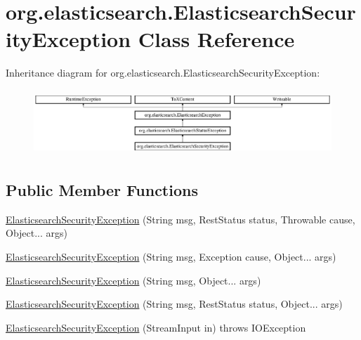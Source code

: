 \hypertarget{classorg_1_1elasticsearch_1_1_elasticsearch_security_exception}{}\section{org.\+elasticsearch.\+Elasticsearch\+Security\+Exception Class Reference}
\label{classorg_1_1elasticsearch_1_1_elasticsearch_security_exception}
Inheritance diagram for org.\+elasticsearch.\+Elasticsearch\+Security\+Exception\+:\begin{figure}[H]
\begin{center}
\leavevmode
\includegraphics[height=2.488889cm]{classorg_1_1elasticsearch_1_1_elasticsearch_security_exception}
\end{center}
\end{figure}
\subsection*{Public Member Functions}
\begin{DoxyCompactItemize}
\item 
\hyperlink{classorg_1_1elasticsearch_1_1_elasticsearch_security_exception_a5f0e9afcfafaaaa5679204ae23c4d54d}{Elasticsearch\+Security\+Exception} (String msg, Rest\+Status status, Throwable cause, Object... args)
\item 
\hyperlink{classorg_1_1elasticsearch_1_1_elasticsearch_security_exception_aea6b2964cf3800b8213d147d5996f900}{Elasticsearch\+Security\+Exception} (String msg, Exception cause, Object... args)
\item 
\hyperlink{classorg_1_1elasticsearch_1_1_elasticsearch_security_exception_a88a789031337b5b83af8ae7a6e0d901f}{Elasticsearch\+Security\+Exception} (String msg, Object... args)
\item 
\hyperlink{classorg_1_1elasticsearch_1_1_elasticsearch_security_exception_a27d286caffe43a68193b8d71e7859e5a}{Elasticsearch\+Security\+Exception} (String msg, Rest\+Status status, Object... args)
\item 
\hyperlink{classorg_1_1elasticsearch_1_1_elasticsearch_security_exception_af0e61ba5f9f35c6f0d63b5b292d66712}{Elasticsearch\+Security\+Exception} (Stream\+Input in)  throws I\+O\+Exception 
\end{DoxyCompactItemize}
